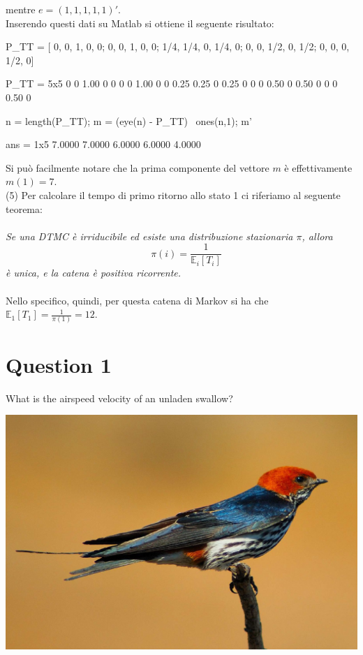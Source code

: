 \documentclass[
	12pt, %
]{fphw}
\begin{document}
	mentre $e = (1, 1, 1, 1, 1)'$.\\
	Inserendo questi dati su Matlab si ottiene il seguente risultato:
	\begin{matlabcode}
		P_TT = [
			0, 0, 1, 0, 0;
			0, 0, 1, 0, 0;
			1/4, 1/4, 0, 1/4, 0;
			0, 0, 1/2, 0, 1/2;
			0, 0, 0, 1/2, 0]
		\end{matlabcode}
		\begin{matlaboutput}
		P_TT = 5x5    
				0         0      1.00      0      0
				0         0      1.00      0      0
				0.25      0.25   0         0.25   0
				0         0      0.50      0      0.50
				0         0      0         0.50   0
		
		\end{matlaboutput}
		\begin{matlabcode}
		n = length(P_TT);
		m = (eye(n) - P_TT) \ ones(n,1);
		m'
		\end{matlabcode}
		\begin{matlaboutput}
		ans = 1x5    
			7.0000    7.0000    6.0000    6.0000    4.0000
		
		\end{matlaboutput}
	
	Si può facilmente notare che la prima componente del vettore $m$ è effettivamente $m(1) = 7$.\\
	(5) Per calcolare il tempo di primo ritorno allo stato 1 ci riferiamo al seguente teorema:\\
	\\
	\null\quad \textit{Se una DTMC è irriducibile ed esiste una distribuzione stazionaria $\pi$, allora
	\begin{equation*}
		\quad\pi(i) = \frac{1}{\mathbb{E}_i [T_i]}
	\end{equation*}
	\null\quad è unica, e la catena è positiva ricorrente.}\\
	\\
	Nello specifico, quindi, per questa catena di Markov si ha che $\mathbb{E}_1 [T_1] = \frac{1}{\pi(1)} = 12$.
\section*{Question 1}

\begin{problem}
	What is the airspeed velocity of an unladen swallow?
\end{problem}
\begin{center}
	\includegraphics[width=0.5\columnwidth]{figures/swallow.jpg} %
\end{center}
\end{document}
